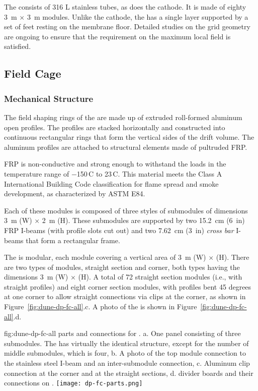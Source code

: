 The  consists of 316 L stainless tubes, as does the cathode. It is made of eighty \SI{3}{\m} $\times$ \SI{3}{\m} modules. Unlike the cathode, the  has a single layer supported by a set of feet resting on the membrane floor.
Detailed studies on the grid geometry are ongoing to ensure that the requirement on the maximum local field is satisfied.

\subsection{Field Cage}

\subsubsection{Mechanical Structure}
The field shaping rings of the  are made up of extruded roll-formed aluminum open profiles.  
The profiles are stacked horizontally and constructed into continuous rectangular rings that form the vertical sides of the drift volume. The aluminum profiles are attached to structural elements made of pultruded  FRP. 

FRP is non-conductive and strong enough to withstand the  loads in the temperature range of \num{-150}\,C to \num{23}\,C.
This material meets the  Class A International Building Code classification for flame spread and smoke development, 
as characterized by ASTM E84. 


Each of these modules is composed of three 
styles of submodules of dimensions \SI{3}{\m} (W) $\times$ \SI{2}{\m} (H). These submodules are supported by two \SI{15.2}{cm} (\SI{6}{in}) FRP I-beams (with profile slots cut out) and two \SI{7.62}{cm} (\SI{3}{in}) \textit{cross bar} I-beams that form a rectangular frame.  


The  is modular, each module covering a vertical area of \SI{3}{\m} (W) $\times$ \tpcheight (H). 
There are two types of modules, straight section and corner, both types having the dimensions \SI{3}{\m} (W) $\times$ \tpcheight (H). A total of \num{72} straight section modules (i.e., with straight profiles) and eight corner section modules, with profiles bent \num{45} degrees at one corner to allow straight connections via clips at the corner, as shown in Figure~\ref{fig:dune-dp-fc-all}.c.  A photo of the   is shown in Figure~\ref{fig:dune-dp-fc-all}.d.

\begin{dunefigure}{fig:dune-dp-fc-all}
{ parts and connections for .  a. One   panel consisting of three submodules.  The  has virtually the identical structure, except for the number of middle submodules, which is four, b. A photo of the top module connection to the stainless steel I-beam and an inter-submodule connection, c. Aluminum clip connection at the corner and at the straight sections, d.  divider boards and their connections on  . }
\texttt{[image: dp-fc-parts.png]}
\end{dunefigure}


